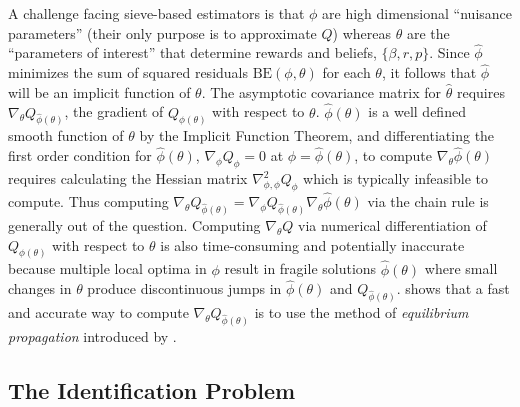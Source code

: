 A challenge facing sieve-based estimators is that $\phi$ are high dimensional  ``nuisance parameters'' 
(their only purpose is to approximate $Q$) whereas $\theta$ are the ``parameters of interest'' 
that determine  rewards and beliefs, $\{\beta,r,p\}$. Since $\hat\phi$  minimizes
the sum of squared residuals $\mbox{BE}(\phi,\theta)$  for each $\theta$, it follows that $\hat\phi$ will be an implicit
function of $\theta$. The asymptotic covariance matrix for $\hat\theta$  requires $\nabla_\theta Q_{\hat\phi(\theta)}$, the gradient
of $Q_{\hat\phi(\theta)}$ with respect to $\theta$. $\hat\phi(\theta)$ is a well defined smooth function
of $\theta$ by the Implicit Function Theorem, and differentiating 
the first order condition for $\hat\phi(\theta)$, 
$\nabla_\phi Q_\phi=0$ at $\phi=\hat\phi(\theta)$, to compute $\nabla_\theta \hat\phi(\theta)$  requires 
calculating the Hessian matrix $\nabla^2_{\phi,\phi} Q_\phi$  which is typically infeasible to compute.
Thus computing $\nabla_\theta Q_{\hat\phi(\theta)}=\nabla_\phi Q_{\hat\phi(\theta)}\nabla_\theta\hat\phi(\theta)$
via the chain rule is generally out of the question. Computing $\nabla_\theta Q$ via numerical differentiation of
$Q_{\hat\phi(\theta)}$ with respect to $\theta$ is also time-consuming and potentially inaccurate
because  multiple local optima in $\phi$ result in fragile
solutions $\hat\phi(\theta)$ where small changes in $\theta$ produce discontinuous jumps in $\hat\phi(\theta)$ and $Q_{\hat\phi(\theta)}$. 
\citet{Nguyen:2025} shows that a fast and accurate way to compute $\nabla_\theta Q_{\hat\phi(\theta)}$ is to use the
method of {\it equilibrium propagation\/} introduced by \citet{ep:2022}.





\subsection{The Identification Problem}
\label{section:identification}

